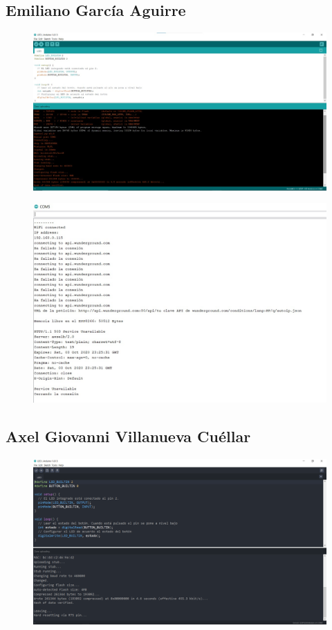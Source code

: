\documentclass[12pt]{article}
\begin{document}
\subsection{Emiliano García Aguirre}
\begin{figure}[!h]
\centering
\includegraphics[width = \textwidth]{emi1}
\end{figure}

\begin{figure}[!h]
\centering
\includegraphics[width = \textwidth]{emi2}
\end{figure}

\newpage

\subsection{Axel Giovanni Villanueva Cuéllar}
\begin{figure}[!h]
\centering
\includegraphics[width = \textwidth]{axel1}
\end{figure}
\end{document}
